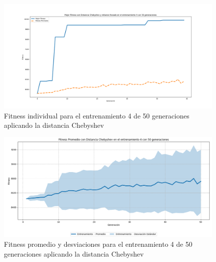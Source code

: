 \documentclass[conference]{IEEEtran}
\begin{document}
\begin{figure}[H]
    \centering
    \includegraphics[width=0.9 \linewidth]{Chebyshev/Fitness_individual_50Gen/Fitness_4_Cheby_50Gen.png}
    \caption{Fitness individual para el entrenamiento 4 de 50 generaciones aplicando la distancia Chebyshev}
    \label{fig:cheb_4_50}
\end{figure}
\begin{figure}[H]
    \centering
    \includegraphics[width=0.9 \linewidth]{Chebyshev/Fitness_individual_50Gen/Fitness_4_Cheby_50Gen_Sombra.png}
    \caption{Fitness promedio y desviaciones para el entrenamiento 4 de 50 generaciones aplicando la distancia Chebyshev}
    \label{fig:cheb_4_50_sombra}
\end{figure}
\end{document}
